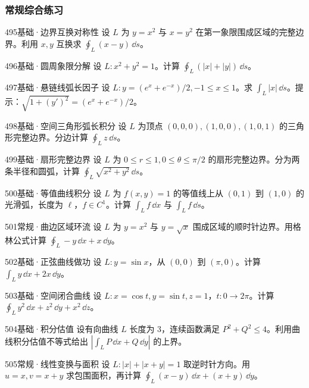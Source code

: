\subsubsection{常规综合练习}
\begin{exercise}{495}{基础·边界互换对称性}
设 $L$ 为 $y=x^2$ 与 $x=y^2$ 在第一象限围成区域的完整边界。利用 $x,y$ 互换求 $\oint_L(x-y)\,\dd s$。
\end{exercise}
\begin{exercise}{496}{基础·圆周象限分解}
设 $L:x^2+y^2=1$。计算 $\oint_L(|x|+|y|)\,\dd s$。
\end{exercise}
\begin{exercise}{497}{基础·悬链线弧长因子}
设 $L:y=(e^x+e^{-x})/2,-1\leq x\leq1$。求 $\int_L|x|\,\dd s$。提示：$\sqrt{1+(y')^2}=(e^x+e^{-x})/2$。
\end{exercise}
\begin{exercise}{498}{基础·空间三角形弧长积分}
设 $L$ 为顶点 $(0,0,0),(1,0,0),(1,0,1)$ 的三角形完整边界。分边计算 $\oint_Lz\,\dd s$。
\end{exercise}
\begin{exercise}{499}{基础·扇形完整边界}
设 $L$ 为 $0\leq r\leq1,0\leq\theta\leq\pi/2$ 的扇形完整边界。分为两条半径和圆弧，计算 $\oint_L\sqrt{x^2+y^2}\,\dd s$。
\end{exercise}
\begin{exercise}{500}{基础·等值曲线积分}
设 $L$ 为 $f(x,y)=1$ 的等值线上从 $(0,1)$ 到 $(1,0)$ 的光滑弧，长度为 $\ell$，$f\in C^1$。计算 $\int_Lf\,\dd x$ 与 $\int_Lf\,\dd s$。
\end{exercise}
\begin{exercise}{501}{常规·曲边区域环流}
设 $L$ 为 $y=x^2$ 与 $y=\sqrt x$ 围成区域的顺时针边界。用格林公式计算 $\oint_L-y\,\dd x+x\,\dd y$。
\end{exercise}
\begin{exercise}{502}{基础·正弦曲线做功}
设 $L:y=\sin x$，从 $(0,0)$ 到 $(\pi,0)$。计算 $\int_Ly\,\dd x+2x\,\dd y$。
\end{exercise}
\begin{exercise}{503}{基础·空间闭合曲线}
设 $L:x=\cos t,y=\sin t,z=1$，$t:0\to2\pi$。计算 $\oint_Ly^2\,\dd x+z^2\,\dd y+x^2\,\dd z$。
\end{exercise}
\begin{exercise}{504}{基础·积分估值}
设有向曲线 $L$ 长度为 $3$，连续函数满足 $P^2+Q^2\leq4$。利用曲线积分估值不等式给出 $|\int_LP\,\dd x+Q\,\dd y|$ 的上界。
\end{exercise}
\begin{exercise}{505}{常规·线性变换与面积}
设 $L:|x|+|x+y|=1$ 取逆时针方向。用 $u=x,v=x+y$ 求包围面积，再计算 $\oint_L(x-y)\,\dd x+(x+y)\,\dd y$。
\end{exercise}
